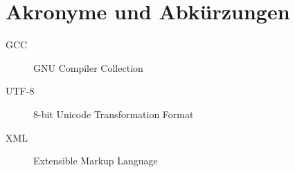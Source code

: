 \chapter{Akronyme und Abkürzungen}

\begin{description}
  \item[GCC] GNU Compiler Collection
  \item[UTF-8] 8-bit Unicode Transformation Format
  \item[XML] Extensible Markup Language
\end{description}

